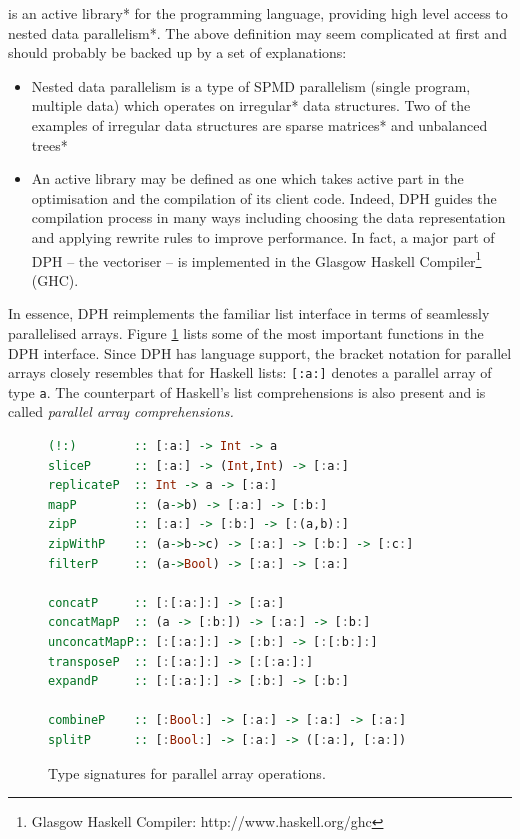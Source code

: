 \documentclass[preamble.tex]{subfiles}
\begin{document}
\idph{} is an \*active library* for the \Haskell programming language, providing high level access to \*nested data parallelism*. The above definition may seem complicated at first and should probably be backed up by a set of explanations:
\begin{itemize}
\item Nested data parallelism is a type of SPMD parallelism (single program, multiple data) which operates on \*irregular* data structures. Two of the examples of irregular data structures are \*sparse matrices* and \*unbalanced trees*

\item An active library may be defined as one which takes active part in the optimisation and the compilation of its client code. Indeed, DPH guides the compilation process in many ways including choosing the data representation \cite{CDL09} and applying rewrite rules \cite{PTH01} to improve performance. In fact, a major part of DPH -- the vectoriser -- is implemented in the Glasgow Haskell Compiler\footnote{Glasgow Haskell Compiler: http://www.haskell.org/ghc} (GHC).

\end{itemize}
In essence, DPH reimplements the familiar list interface in terms of seamlessly parallelised arrays. Figure \ref{fig:Lit:DPH-interface-functions} lists some of the most important functions in the DPH interface. Since DPH has language support, the bracket notation for parallel arrays closely resembles that for Haskell lists: \lstinline[basicstyle={\ttfamily}]![:a:]! denotes a parallel array of type \lstinline[basicstyle={\ttfamily}]!a!. The counterpart of Haskell's list comprehensions is also present and is called \emph{parallel array comprehensions.}

\begin{figure}
\begin{lstlisting}[basicstyle={\ttfamily},language=Haskell,tabsize=4]
(!:)		:: [:a:] -> Int -> a
sliceP		:: [:a:] -> (Int,Int) -> [:a:]
replicateP	:: Int -> a -> [:a:]
mapP		:: (a->b) -> [:a:] -> [:b:]
zipP		:: [:a:] -> [:b:] -> [:(a,b):]
zipWithP	:: (a->b->c) -> [:a:] -> [:b:] -> [:c:]
filterP		:: (a->Bool) -> [:a:] -> [:a:]

concatP		:: [:[:a:]:] -> [:a:]
concatMapP	:: (a -> [:b:]) -> [:a:] -> [:b:]
unconcatMapP:: [:[:a:]:] -> [:b:] -> [:[:b:]:]
transposeP	:: [:[:a:]:] -> [:[:a:]:]
expandP		:: [:[:a:]:] -> [:b:] -> [:b:]

combineP	:: [:Bool:] -> [:a:] -> [:a:] -> [:a:]
splitP		:: [:Bool:] -> [:a:] -> ([:a:], [:a:])
\end{lstlisting}

\caption{\label{fig:Lit:DPH-interface-functions}{Type signatures for parallel array operations.}}
\end{figure}
\end{document}
